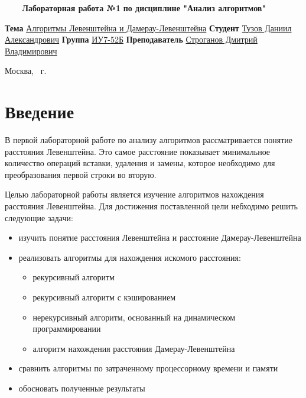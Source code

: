 \documentclass{article}
\begin{document}
\begin{titlepage}
	\noindent\begin{minipage}{1.0\textwidth}\centering
		\Large\textbf{   ~~~ Лабораторная работа №1}\newline
		\textbf{по дисциплине "Анализ алгоритмов"}\newline\newline\newline\newline\newline
	\end{minipage}

	\noindent\textbf{Тема} \underline{Алгоритмы Левенштейна и Дамерау-Левенштейна}\newline\newline
	\textbf{Студент} \underline{Тузов Даниил Александрович}\newline\newline
	\textbf{Группа} \underline{ИУ7-52Б}\newline\newline
	\textbf{Преподаватель} \underline{Строганов Дмитрий Владимирович}
	
	\begin{center}
		\vfill
		Москва, \the\year ~г.
	\end{center}
	\restoregeometry
	\clearpage
\end{titlepage}

\renewcommand{\contentsname}{Содержание} 
\tableofcontents
\setcounter{page}{2}
\clearpage

\section*{Введение}
В первой лабораторной работе по анализу алгоритмов рассматривается понятие расстояния Левенштейна. 
Это самое расстояние показывает минимальное количество операций вставки, удаления и замены, которое 
необходимо для преобразования первой строки во вторую.

Целью лабораторной работы является изучение алгоритмов нахождения расстояния Левенштейна.
Для достижения поставленной цели небходимо решить следующие задачи:
\begin{itemize}
	\item изучить понятие расстояния Левенштейна и расстояние Дамерау-Левенштейна
	\item реализовать алгоритмы для нахождения искомого расстояния:
	\begin{itemize}
		\item рекурсивный алгоритм
		\item рекурсивный алгоритм с кэшированием
		\item нерекурсивный алгоритм, основанный на динамическом программировании
		\item алгоритм нахождения расстояния Дамерау-Левенштейна
	\end{itemize}
	\item сравнить алгоритмы по затраченному процессорному времени и памяти
	\item обосновать полученные результаты
\end{itemize}
\end{document}

